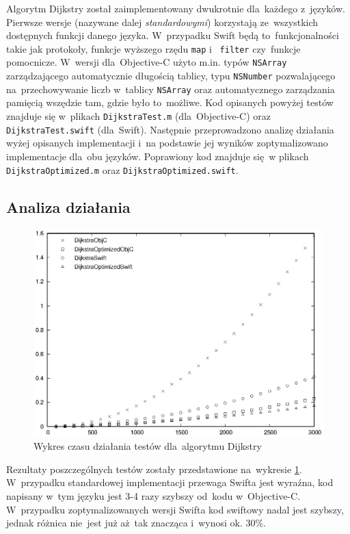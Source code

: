\documentclass[mgr, shortabstract]{iithesis}
\newcommand{\swiftinline}[1]{
    \texttt{#1}
}
\newcommand{\objcinline}[1]{
    \texttt{#1}
}
\begin{document}
Algorytm Dijkstry został zaimplementowany dwukrotnie dla~każdego z~języków. Pierwsze wersje (nazywane dalej \textit{standardowymi}) korzystają ze~wszystkich dostępnych funkcji danego języka. W~przypadku Swift będą to~funkcjonalności takie jak protokoły, funkcje wyższego rzędu \swiftinline{map} i~\swiftinline{filter} czy~funkcje pomocnicze. W~wersji dla~Objective-C użyto m.in. typów \objcinline{NSArray} zarządzającego automatycznie długością tablicy, typu \objcinline{NSNumber} pozwalającego na~przechowywanie liczb w~tablicy \objcinline{NSArray} oraz automatycznego zarządzania pamięcią wszędzie tam, gdzie było to~możliwe. Kod opisanych powyżej testów znajduje się w~plikach \texttt{DijkstraTest.m} (dla~Objective-C) oraz \texttt{DijkstraTest.swift} (dla~Swift). Następnie przeprowadzono analizę działania wyżej opisanych implementacji i~na podstawie jej wyników zoptymalizowano implementacje dla~obu języków. Poprawiony kod znajduje się w plikach \texttt{DijkstraOptimized.m} oraz \texttt{DijkstraOptimized.swift}.

\subsection{Analiza działania}

\begin{figure}
    \includegraphics{plots/Dijkstra}
    \caption{Wykres czasu działania testów dla~algorytmu Dijkstry}
    \label{p:dijkstra}
\end{figure}

Rezultaty poszczególnych testów zostały przedstawione na~wykresie \ref{p:dijkstra}. W~przypadku standardowej implementacji przewaga Swifta jest wyraźna, kod napisany w~tym języku jest 3-4 razy szybszy od~kodu w~Objective-C. W~przypadku zoptymalizowanych wersji Swifta kod swiftowy nadal jest szybszy, jednak różnica nie~jest już aż~tak znacząca i~wynosi ok. 30\%.
\end{document}
